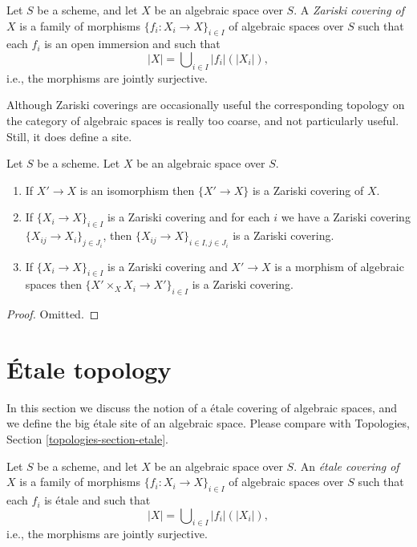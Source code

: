 \begin{definition}
\label{definition-zariski-covering}
Let $S$ be a scheme, and let $X$ be an algebraic space over $S$.
A {\it Zariski covering of $X$} is a family of morphisms
$\{f_i : X_i \to X\}_{i \in I}$ of algebraic spaces over $S$
such that each $f_i$ is an open immersion
and such that
$$
|X| = \bigcup\nolimits_{i \in I} |f_i|(|X_i|),
$$
i.e., the morphisms are jointly surjective.
\end{definition}

\noindent
Although Zariski coverings are occasionally useful the corresponding topology
on the category of algebraic spaces is really too coarse, and not particularly
useful. Still, it does define a site.

\begin{lemma}
\label{lemma-zariski}
Let $S$ be a scheme.
Let $X$ be an algebraic space over $S$.
\begin{enumerate}
\item If $X' \to X$ is an isomorphism then $\{X' \to X\}$
is a Zariski covering of $X$.
\item If $\{X_i \to X\}_{i\in I}$ is a Zariski covering and for each
$i$ we have a Zariski covering $\{X_{ij} \to X_i\}_{j\in J_i}$, then
$\{X_{ij} \to X\}_{i \in I, j\in J_i}$ is a Zariski covering.
\item If $\{X_i \to X\}_{i\in I}$ is a Zariski covering
and $X' \to X$ is a morphism of algebraic spaces then
$\{X' \times_X X_i \to X'\}_{i\in I}$ is a Zariski covering.
\end{enumerate}
\end{lemma}

\begin{proof}
Omitted.
\end{proof}










\section{\'Etale topology}
\label{section-etale}

\noindent
In this section we discuss the notion of a \'etale covering of
algebraic spaces, and we define the big \'etale site of an
algebraic space. Please compare with
Topologies, Section \ref{topologies-section-etale}.

\begin{definition}
\label{definition-etale-covering}
Let $S$ be a scheme, and let $X$ be an algebraic space over $S$.
An {\it \'etale covering of $X$} is a family of morphisms
$\{f_i : X_i \to X\}_{i \in I}$ of algebraic spaces over $S$
such that each $f_i$ is \'etale
and such that
$$
|X| = \bigcup\nolimits_{i \in I} |f_i|(|X_i|),
$$
i.e., the morphisms are jointly surjective.
\end{definition}

